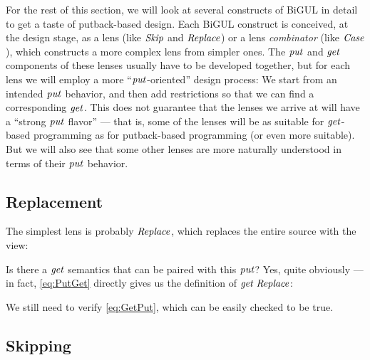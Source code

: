 For the rest of this section, we will look at several constructs of BiGUL in detail to get a taste of putback-based design.
Each BiGUL construct is conceived, at the design stage, as a lens (like \ensuremath{\Conid{Skip}} and \ensuremath{\Conid{Replace}}) or a lens \emph{combinator} (like \ensuremath{\Conid{Case}}), which constructs a more complex lens from simpler ones.
The \ensuremath{\Varid{put}} and \ensuremath{\Varid{get}} components of these lenses usually have to be developed together, but for each lens we will employ a more ``\ensuremath{\Varid{put}}-oriented'' design process: We start from an intended \ensuremath{\Varid{put}} behavior, and then add restrictions so that we can find a corresponding \ensuremath{\Varid{get}}.
This does not guarantee that the lenses we arrive at will have a ``strong \ensuremath{\Varid{put}} flavor'' --- that is, some of the lenses will be as suitable for \ensuremath{\Varid{get}}-based programming as for putback-based programming (or even more suitable).
But we will also see that some other lenses are more naturally understood in terms of their \ensuremath{\Varid{put}} behavior.

\subsection{Replacement}

The simplest lens is probably \ensuremath{\Conid{Replace}}, which replaces the entire source with the view:
\begin{hscode}\SaveRestoreHook
{}%
%
\>[B]{}\;\;\;\mathrel{=}\;\<[E]%
\ColumnHook
\end{hscode}\resethooks
Is there a \ensuremath{\Varid{get}} semantics that can be paired with this \ensuremath{\Varid{put}}? Yes, quite obviously --- in fact, \ref{eq:PutGet} directly gives us the definition of \ensuremath{\Varid{get}\;\Conid{Replace}}:
\begin{hscode}\SaveRestoreHook
{}%
%
\>[B]{}\;\;\mathrel{=}\;\<[E]%
\ColumnHook
\end{hscode}\resethooks
We still need to verify \ref{eq:GetPut}, which can be easily checked to be true.

\subsection{Skipping}

